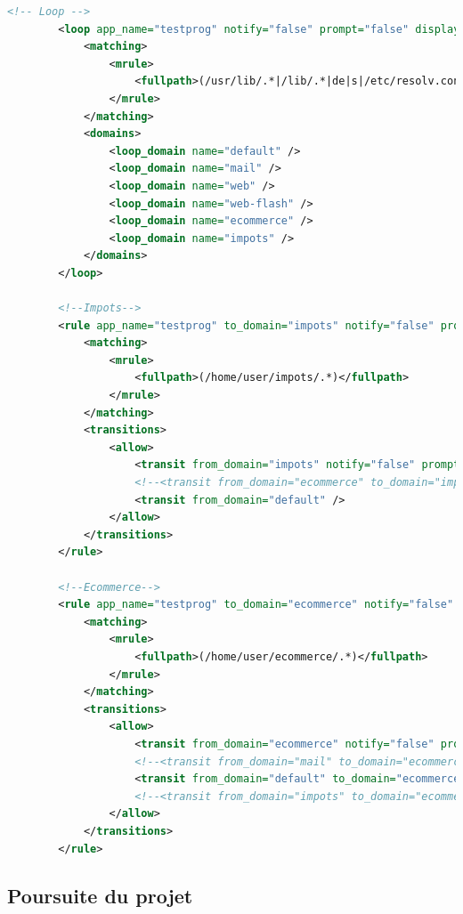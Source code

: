 \documentclass[pdftex,a4paper,titlepage,11pt]{article}
\begin{document}
\begin{lstlisting}[language=XML]
		<!-- Loop -->
		<loop app_name="testprog" notify="false" prompt="false" display_name="Loop">
			<matching>
				<mrule>
					<fullpath>(/usr/lib/.*|/lib/.*|de|s|/etc/resolv.conf|/etc/nsswitch.conf|/etc/host.conf|/etc/hosts)</fullpath>
				</mrule>
			</matching>
			<domains>
				<loop_domain name="default" />
				<loop_domain name="mail" />
				<loop_domain name="web" />
				<loop_domain name="web-flash" />
				<loop_domain name="ecommerce" />
				<loop_domain name="impots" />
			</domains>
		</loop>

		<!--Impots-->
		<rule app_name="testprog" to_domain="impots" notify="false" prompt="true" display_name="domaine impots">
			<matching>
				<mrule>
					<fullpath>(/home/user/impots/.*)</fullpath>
				</mrule>
			</matching>
			<transitions>
				<allow>
					<transit from_domain="impots" notify="false" prompt="false"/>
					<!--<transit from_domain="ecommerce" to_domain="impots" notify="false" prompt="true"/>-->
					<transit from_domain="default" />
				</allow>
			</transitions>
		</rule>

		<!--Ecommerce-->
		<rule app_name="testprog" to_domain="ecommerce" notify="false" prompt="true" display_name="domaine ecommerce">
			<matching>
				<mrule>
					<fullpath>(/home/user/ecommerce/.*)</fullpath>
				</mrule>
			</matching>
			<transitions>
				<allow>
					<transit from_domain="ecommerce" notify="false" prompt="false"/>
					<!--<transit from_domain="mail" to_domain="ecommerce" prompt="true" />-->
					<transit from_domain="default" to_domain="ecommerce" prompt="true" />
					<!--<transit from_domain="impots" to_domain="ecommerce" prompt="true" />-->
				</allow>
			</transitions>
		</rule>
\end{lstlisting}

\subsection{Poursuite du projet}
\end{document}

